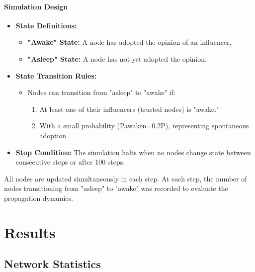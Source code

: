 \documentclass[conference]{IEEEtran}
\begin{document}
\paragraph{Simulation Design}

\begin{itemize}
    \item \textbf{State Definitions:}
    \begin{itemize}
        \item \textbf{"Awake" State:} A node has adopted the opinion of an influencer.
        \item \textbf{"Asleep" State:} A node has not yet adopted the opinion.
    \end{itemize}
    \item \textbf{State Transition Rules:}
    \begin{itemize}
        \item Nodes can transition from "asleep" to "awake" if:
        \begin{enumerate}
            \item At least one of their influencers (trusted nodes) is "awake."
            \item With a small probability (Pawaken=0.2P), representing spontaneous adoption.
        \end{enumerate}
    \end{itemize}
    \item \textbf{Stop Condition:} The simulation halts when no nodes change state between consecutive steps or after 100 steps.
\end{itemize}
All nodes are updated simultaneously in each step.
At each step, the number of nodes transitioning from "asleep" to "awake" was recorded to evaluate the propagation dynamics.

\section{Results}
\subsection{Network Statistics}
\end{document}
